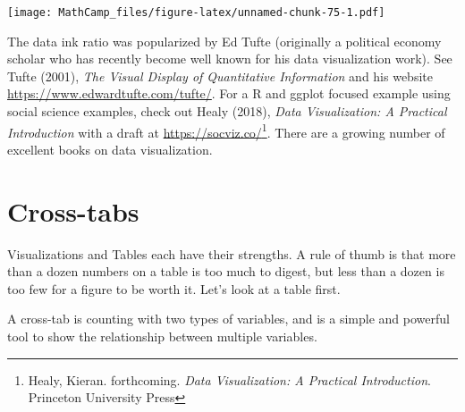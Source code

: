 \documentclass[
]{book}
\newenvironment{Shaded}{\begin{snugshade}}{\end{snugshade}}
\newcommand{\KeywordTok}[1]{\textcolor[rgb]{0.13,0.29,0.53}{\textbf{#1}}}
\newcommand{\NormalTok}[1]{#1}
\newcommand{\OperatorTok}[1]{\textcolor[rgb]{0.81,0.36,0.00}{\textbf{#1}}}
\newcommand{\StringTok}[1]{\textcolor[rgb]{0.31,0.60,0.02}{#1}}
\theoremstyle{definition}
\theoremstyle{definition}
\theoremstyle{definition}
\theoremstyle{definition}
\theoremstyle{remark}
\begin{document}
\texttt{[image: MathCamp\_files/figure-latex/unnamed-chunk-75-1.pdf]}

The data ink ratio was popularized by Ed Tufte (originally a political economy scholar who has recently become well known for his data visualization work). See Tufte (2001), \emph{The Visual Display of Quantitative Information} and his website \url{https://www.edwardtufte.com/tufte/}. For a R and ggplot focused example using social science examples, check out Healy (2018), \emph{Data Visualization: A Practical Introduction} with a draft at \url{https://socviz.co/}\footnote{Healy, Kieran. forthcoming. \emph{Data Visualization: A Practical Introduction}. Princeton University Press}. There are a growing number of excellent books on data visualization.

\hypertarget{cross-tabs}{%
\section{Cross-tabs}\label{cross-tabs}}

Visualizations and Tables each have their strengths. A rule of thumb is that more than a dozen numbers on a table is too much to digest, but less than a dozen is too few for a figure to be worth it. Let's look at a table first.

A cross-tab is counting with two types of variables, and is a simple and powerful tool to show the relationship between multiple variables.

\begin{Shaded}
\end{Shaded}
\end{document}
